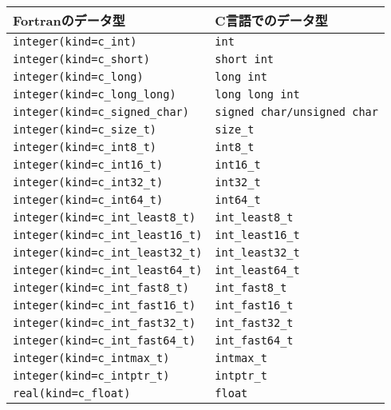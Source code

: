 \documentclass[12pt,a4paper,dvipdfmx]{jbook} %
\begin{document}
\begin{table}[H]
\begin{tabularx}{\linewidth}{XX}
\toprule
\rowcolor{Snow2}
Fortranのデータ型 & C言語でのデータ型 \\
\midrule
\texttt{integer(kind=c\_int)}                   & \texttt{int}\\
\texttt{integer(kind=c\_short)}                 & \texttt{short int}\\
\texttt{integer(kind=c\_long)}                  & \texttt{long int}\\
\texttt{integer(kind=c\_long\_long)}            & \texttt{long long int}\\
\texttt{integer(kind=c\_signed\_char)}          & \texttt{signed char/unsigned char}\\
\texttt{integer(kind=c\_size\_t)}               & \texttt{size\_t}\\
\texttt{integer(kind=c\_int8\_t)}               & \texttt{int8\_t}\\
\texttt{integer(kind=c\_int16\_t)}              & \texttt{int16\_t}\\
\texttt{integer(kind=c\_int32\_t)}              & \texttt{int32\_t}\\
\texttt{integer(kind=c\_int64\_t)}              & \texttt{int64\_t}\\
\texttt{integer(kind=c\_int\_least8\_t)}        & \texttt{int\_least8\_t}\\
\texttt{integer(kind=c\_int\_least16\_t)}       & \texttt{int\_least16\_t}\\
\texttt{integer(kind=c\_int\_least32\_t)}       & \texttt{int\_least32\_t}\\
\texttt{integer(kind=c\_int\_least64\_t)}       & \texttt{int\_least64\_t}\\
\texttt{integer(kind=c\_int\_fast8\_t)}         & \texttt{int\_fast8\_t}\\
\texttt{integer(kind=c\_int\_fast16\_t)}        & \texttt{int\_fast16\_t}\\
\texttt{integer(kind=c\_int\_fast32\_t)}        & \texttt{int\_fast32\_t}\\
\texttt{integer(kind=c\_int\_fast64\_t)}        & \texttt{int\_fast64\_t}\\
\texttt{integer(kind=c\_intmax\_t)}             & \texttt{intmax\_t}\\
\texttt{integer(kind=c\_intptr\_t)}             & \texttt{intptr\_t}\\
\texttt{real(kind=c\_float)}                    & \texttt{float}\\

\end{tabularx}
\end{table}
\end{document}
